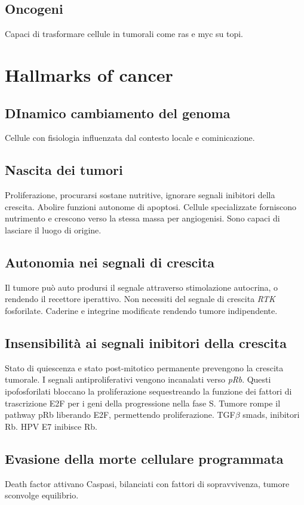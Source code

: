 	\subsection{Oncogeni}
	Capaci di trasformare cellule in tumorali come ras e myc su topi.

\section{Hallmarks of cancer}

	\subsection{DInamico cambiamento del genoma}
	Cellule con fisiologia influenzata dal contesto locale e cominicazione.

	\subsection{Nascita dei tumori}
	Proliferazione, procurarsi sostane nutritive, ignorare segnali inibitori della crescita.
	Abolire funzioni autonome di apoptosi.
	Cellule specializzate forniscono nutrimento e crescono verso la stessa massa per angiogenisi.
	Sono capaci di lasciare il luogo di origine.

	\subsection{Autonomia nei segnali di crescita}
	Il tumore pu\`o auto prodursi il segnale attraverso stimolazione autocrina, o rendendo il recettore iperattivo.
	Non necessiti del segnale di crescita \emph{RTK} fosforilate.
	Caderine e integrine modificate rendendo tumore indipendente.

	\subsection{Insensibilit\`a ai segnali inibitori della crescita}
	Stato di quiescenza e stato post-mitotico permanente prevengono la crescita tumorale.
	I segnali antiproliferativi vengono incanalati verso \emph{pRb}.
	Questi ipofosforilati bloccano la proliferazione sequestreando la funzione dei fattori di trascrizione E2F per i geni della progressione nella fase S.
	Tumore rompe il pathway pRb liberando E2F, permettendo proliferazione.
	TGF$\beta$ smads, inibitori Rb.
	HPV E7 inibisce Rb.

	\subsection{Evasione della morte cellulare programmata}
	Death factor attivano Caspasi, bilanciati con fattori di sopravvivenza, tumore sconvolge equilibrio.

